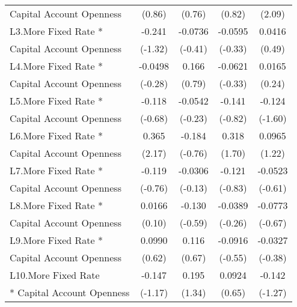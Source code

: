 {\begin{tabular}{l*{4}{c}}
Capital Account Openness&      (0.86)         &      (0.76)         &      (0.82)         &      (2.09)         \\
[1em]
L3.More Fixed Rate *&      -0.241         &     -0.0736         &     -0.0595         &      0.0416         \\
Capital Account Openness&     (-1.32)         &     (-0.41)         &     (-0.33)         &      (0.49)         \\
[1em]
L4.More Fixed Rate *&     -0.0498         &       0.166         &     -0.0621         &      0.0165         \\
Capital Account Openness&     (-0.28)         &      (0.79)         &     (-0.33)         &      (0.24)         \\
[1em]
L5.More Fixed Rate *&      -0.118         &     -0.0542         &      -0.141         &      -0.124         \\
Capital Account Openness&     (-0.68)         &     (-0.23)         &     (-0.82)         &     (-1.60)         \\
[1em]
L6.More Fixed Rate *&       0.365\sym{*}  &      -0.184         &       0.318         &      0.0965         \\
Capital Account Openness&      (2.17)         &     (-0.76)         &      (1.70)         &      (1.22)         \\
[1em]
L7.More Fixed Rate *&      -0.119         &     -0.0306         &      -0.121         &     -0.0523         \\
Capital Account Openness&     (-0.76)         &     (-0.13)         &     (-0.83)         &     (-0.61)         \\
[1em]
L8.More Fixed Rate *&      0.0166         &      -0.130         &     -0.0389         &     -0.0773         \\
Capital Account Openness&      (0.10)         &     (-0.59)         &     (-0.26)         &     (-0.67)         \\
[1em]
L9.More Fixed Rate *&      0.0990         &       0.116         &     -0.0916         &     -0.0327         \\
Capital Account Openness&      (0.62)         &      (0.67)         &     (-0.55)         &     (-0.38)         \\
[1em]
L10.More Fixed Rate &      -0.147         &       0.195         &      0.0924         &      -0.142         \\
* Capital Account Openness&     (-1.17)         &      (1.34)         &      (0.65)         &     (-1.27)         \\

\end{tabular}}
